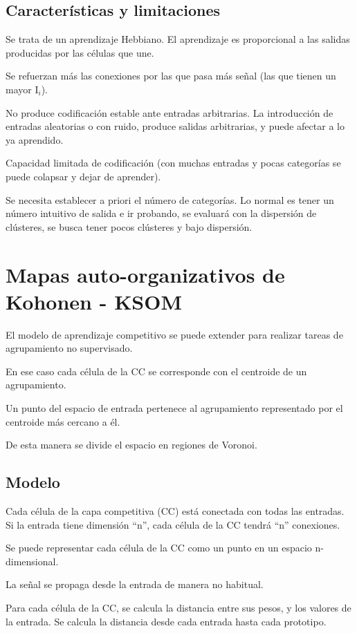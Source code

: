 \documentclass[12pt, twoside, openright]{report} %
\begin{document}
\subsection{Características y limitaciones}
Se trata de un aprendizaje Hebbiano. El aprendizaje es proporcional a las salidas producidas por las células que une.

Se refuerzan más las conexiones por las que pasa más señal (las que tienen un mayor I$_i$).

No produce codificación estable ante entradas arbitrarias. La introducción de entradas aleatorias o con ruido, produce salidas arbitrarias, y puede afectar a lo ya aprendido.

Capacidad limitada de codificación (con muchas entradas y pocas categorías se puede colapsar y dejar de aprender).

Se necesita establecer a priori el número de categorías. Lo normal es tener un número intuitivo de salida e ir probando, se evaluará con la dispersión de clústeres, se busca tener pocos clústeres y bajo dispersión.

\section{Mapas auto-organizativos de Kohonen - KSOM}
El modelo de aprendizaje competitivo se puede extender para realizar tareas de agrupamiento no supervisado.

En ese caso cada célula de la CC se corresponde con el centroide de un agrupamiento.

Un punto del espacio de entrada pertenece al agrupamiento representado por el centroide más cercano a él.

De esta manera se divide el espacio en regiones de Voronoi.

\subsection{Modelo}
Cada célula de la capa competitiva (CC) está conectada con todas las entradas. Si la entrada tiene dimensión “n”, cada célula de la CC tendrá “n” conexiones.

Se puede representar cada célula de la CC como un punto en un espacio n-dimensional.

La señal se propaga desde la entrada de manera no habitual.

Para cada célula de la CC, se calcula la distancia entre sus pesos, y los valores de la entrada. Se calcula la distancia desde cada entrada hasta cada prototipo.
\end{document}
